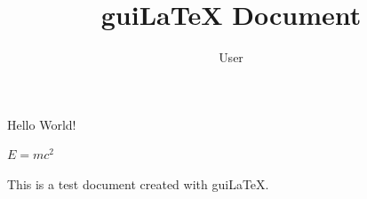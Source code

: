 \documentclass{article}
\begin{document}
\title{guiLaTeX Document}
\author{User}
\maketitle

Hello World!

$E = mc^2$

This is a test document created with guiLaTeX.
\end{document}
